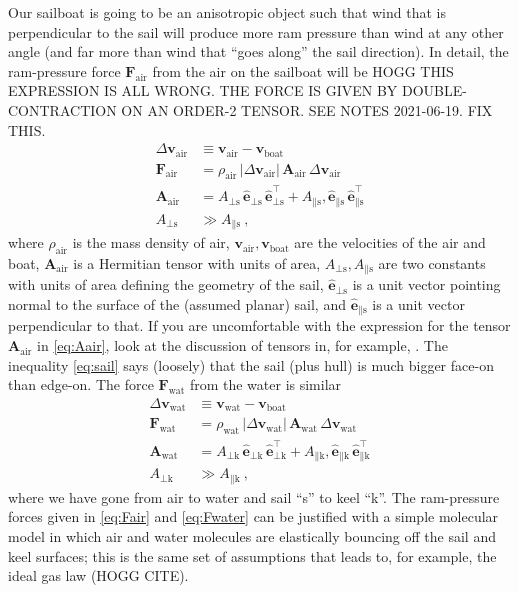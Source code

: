 \documentclass{article}
\renewcommand{\vec}[1]{\boldsymbol{#1}}
\newcommand{\uvec}{\vec{\hat{e}}}
\newcommand{\tensor}[1]{\mathbf{#1}}
\newcommand{\air}{\text{air}}
\newcommand{\water}{\text{wat}}
\newcommand{\boat}{\text{boat}}
\newcommand{\sail}{\text{s}}
\newcommand{\keel}{\text{k}}
\newcommand{\vair}{\vec{v}_\air}
\newcommand{\vwater}{\vec{v}_\water}
\newcommand{\vboat}{\vec{v}_\boat}
\begin{document}
Our sailboat is going to be an anisotropic object such that wind that is perpendicular to the sail will produce more ram pressure than wind at any other angle (and far more than wind that ``goes along'' the sail direction).
In detail, the ram-pressure force $\vec{F}_\air$ from the air on the sailboat will be
HOGG THIS EXPRESSION IS ALL WRONG. THE FORCE IS GIVEN BY DOUBLE-CONTRACTION ON AN ORDER-2 TENSOR. SEE NOTES 2021-06-19. FIX THIS.
\begin{align}
    \Delta\vair &\equiv \vair-\vboat
    \\
    \vec{F}_\air &= \rho_\air\,|\Delta\vair|\,\tensor{A}_\air\,\Delta\vair \label{eq:Fair}
    \\
    \tensor{A}_\air &= A_{\perp\sail}\,\uvec_{\perp\sail}\,\uvec_{\perp\sail}^\top + A_{\parallel\sail},\uvec_{\parallel\sail}\,\uvec_{\parallel\sail}^\top \label{eq:Aair}
    \\
    A_{\perp\sail} &\gg A_{\parallel\sail} \label{eq:sail}
    ~,
\end{align}
where $\rho_\air$ is the mass density of air, $\vair,\vboat$ are the velocities of the air and boat, $\tensor{A}_\air$ is a Hermitian tensor with units of area, $A_{\perp\sail}, A_{\parallel\sail}$ are two constants with units of area defining the geometry of the sail, $\uvec_{\perp\sail}$ is a unit vector pointing normal to the surface of the (assumed planar) sail, and $\uvec_{\parallel\sail}$ is a unit vector perpendicular to that.
If you are uncomfortable with the expression for the tensor $\tensor{A}_\air$ in \eqref{eq:Aair}, look at the discussion of tensors in, for example, \cite{kusse}.
The inequality \eqref{eq:sail} says (loosely) that the sail (plus hull) is much bigger face-on than edge-on.
The force $\vec{F}_\water$ from the water is similar
\begin{align}
    \Delta\vwater &\equiv \vwater-\vboat
    \\
    \vec{F}_\water &= \rho_\water\,|\Delta\vwater|\,\tensor{A}_\water\,\Delta\vwater \label{eq:Fwater}
    \\
    \tensor{A}_\water &= A_{\perp\keel}\,\uvec_{\perp\keel}\,\uvec_{\perp\keel}^\top + A_{\parallel\keel},\uvec_{\parallel\keel}\,\uvec_{\parallel\keel}^\top
    \\
    A_{\perp\keel} &\gg A_{\parallel\keel} ~,
\end{align}
where we have gone from air to water and sail ``s'' to keel ``k''.
The ram-pressure forces given in \eqref{eq:Fair} and \eqref{eq:Fwater} can be justified with a simple molecular model in which air and water molecules are elastically bouncing off the sail and keel surfaces; this is the same set of assumptions that leads to, for example, the ideal gas law (HOGG CITE).
\end{document}
